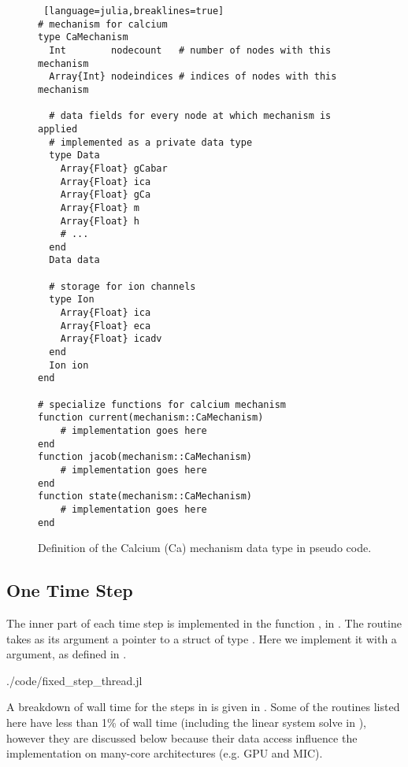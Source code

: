 \begin{figure}[htp!]
\begin{shaded}
\begin{lstlisting} [language=julia,breaklines=true]
# mechanism for calcium
type CaMechanism
  Int        nodecount   # number of nodes with this mechanism
  Array{Int} nodeindices # indices of nodes with this mechanism

  # data fields for every node at which mechanism is applied
  # implemented as a private data type
  type Data
    Array{Float} gCabar
    Array{Float} ica
    Array{Float} gCa
    Array{Float} m
    Array{Float} h
    # ...
  end
  Data data

  # storage for ion channels
  type Ion
    Array{Float} ica
    Array{Float} eca
    Array{Float} icadv
  end
  Ion ion
end

# specialize functions for calcium mechanism
function current(mechanism::CaMechanism)
    # implementation goes here
end
function jacob(mechanism::CaMechanism)
    # implementation goes here
end
function state(mechanism::CaMechanism)
    # implementation goes here
end
\end{lstlisting}
\end{shaded}
\caption{Definition of the Calcium (Ca) mechanism data type in pseudo code.}
\label{fig:CaMechanism}
\end{figure}

\clearpage
\subsection{One Time Step}
The inner part of each time step is implemented in the function , in . The routine takes as its argument a pointer to a struct of type . Here we implement it with a  argument, as defined in .


\begin{shaded}
 {./code/fixed_step_thread.jl}
\end{shaded}

A breakdown of wall time for the steps in  is given in . Some of the routines listed here have less than 1\% of wall time (including the linear system solve in ), however they are discussed below because their data access influence the implementation on many-core architectures (e.g. GPU and MIC).
